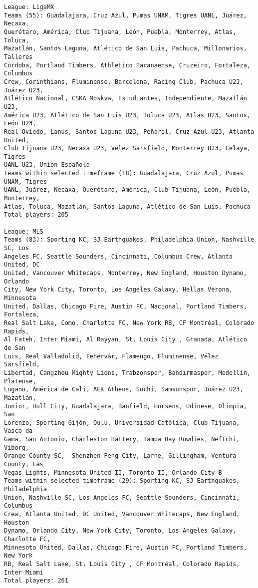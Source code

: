 \documentclass[11pt]{article}
\begin{document}
\begin{Verbatim}[commandchars=\\\{\}]
League: LigaMX
Teams (55): Guadalajara, Cruz Azul, Pumas UNAM, Tigres UANL, Juárez, Necaxa,
Querétaro, América, Club Tijuana, León, Puebla, Monterrey, Atlas, Toluca,
Mazatlán, Santos Laguna, Atlético de San Luis, Pachuca, Millonarios, Talleres
Córdoba, Portland Timbers, Athletico Paranaense, Cruzeiro, Fortaleza, Columbus
Crew, Corinthians, Fluminense, Barcelona, Racing Club, Pachuca U23, Juárez U23,
Atlético Nacional, CSKA Moskva, Estudiantes, Independiente, Mazatlán U23,
América U23, Atlético de San Luis U23, Toluca U23, Atlas U23, Santos, León U23,
Real Oviedo, Lanús, Santos Laguna U23, Peñarol, Cruz Azul U23, Atlanta United,
Club Tijuana U23, Necaxa U23, Vélez Sarsfield, Monterrey U23, Celaya, Tigres
UANL U23, Unión Española
Teams within selected timeframe (18): Guadalajara, Cruz Azul, Pumas UNAM, Tigres
UANL, Juárez, Necaxa, Querétaro, América, Club Tijuana, León, Puebla, Monterrey,
Atlas, Toluca, Mazatlán, Santos Laguna, Atlético de San Luis, Pachuca
Total players: 205

League: MLS
Teams (83): Sporting KC, SJ Earthquakes, Philadelphia Union, Nashville SC, Los
Angeles FC, Seattle Sounders, Cincinnati, Columbus Crew, Atlanta United, DC
United, Vancouver Whitecaps, Monterrey, New England, Houston Dynamo, Orlando
City, New York City, Toronto, Los Angeles Galaxy, Hellas Verona, Minnesota
United, Dallas, Chicago Fire, Austin FC, Nacional, Portland Timbers, Fortaleza,
Real Salt Lake, Como, Charlotte FC, New York RB, CF Montréal, Colorado Rapids,
Al Fateh, Inter Miami, Al Rayyan, St. Louis City , Granada, Atlético de San
Luis, Real Valladolid, Fehérvár, Flamengo, Fluminense, Vélez Sarsfield,
Libertad, Cangzhou Mighty Lions, Trabzonspor, Bandırmaspor, Medellín, Platense,
Lugano, América de Cali, AEK Athens, Sochi, Samsunspor, Juárez U23, Mazatlán,
Junior, Hull City, Guadalajara, Banfield, Horsens, Udinese, Olimpia, San
Lorenzo, Sporting Gijón, Oulu, Universidad Católica, Club Tijuana, Vasco da
Gama, San Antonio, Charleston Battery, Tampa Bay Rowdies, Neftchi, Viborg,
Orange County SC,  Shenzhen Peng City, Larne, Gillingham, Ventura County, Las
Vegas Lights, Minnesota United II, Toronto II, Orlando City B
Teams within selected timeframe (29): Sporting KC, SJ Earthquakes, Philadelphia
Union, Nashville SC, Los Angeles FC, Seattle Sounders, Cincinnati, Columbus
Crew, Atlanta United, DC United, Vancouver Whitecaps, New England, Houston
Dynamo, Orlando City, New York City, Toronto, Los Angeles Galaxy, Charlotte FC,
Minnesota United, Dallas, Chicago Fire, Austin FC, Portland Timbers, New York
RB, Real Salt Lake, St. Louis City , CF Montréal, Colorado Rapids, Inter Miami
Total players: 261


\end{Verbatim}
\end{document}
